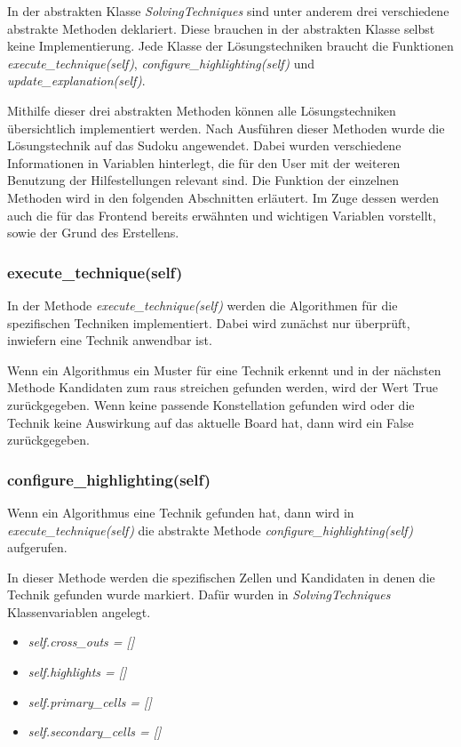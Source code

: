 In der abstrakten Klasse \textit{SolvingTechniques} sind unter anderem drei verschiedene abstrakte Methoden deklariert. Diese brauchen in der abstrakten Klasse selbst keine Implementierung. Jede Klasse der Lösungstechniken braucht die Funktionen \textit{execute\_technique(self)}, \textit{configure\_highlighting(self)} und \textit{update\_explanation(self)}.

Mithilfe dieser drei abstrakten Methoden können alle Lösungstechniken übersichtlich implementiert werden. Nach Ausführen dieser Methoden wurde die Lösungstechnik auf das Sudoku angewendet. Dabei  wurden verschiedene Informationen in Variablen hinterlegt, die für den User mit der weiteren Benutzung der Hilfestellungen relevant sind.
Die Funktion der einzelnen Methoden wird in den folgenden Abschnitten erläutert. Im Zuge dessen werden auch die für das Frontend bereits erwähnten und wichtigen Variablen vorstellt, sowie der Grund des Erstellens.

\subsubsection{execute\_technique(self)}
In der Methode \textit{execute\_technique(self)} werden die Algorithmen für die spezifischen Techniken implementiert. Dabei wird zunächst nur überprüft, inwiefern eine Technik anwendbar ist. 

Wenn ein Algorithmus ein Muster für eine Technik erkennt und in der nächsten Methode Kandidaten zum raus streichen gefunden werden, wird der Wert True zurückgegeben. Wenn keine passende Konstellation gefunden wird oder die Technik keine Auswirkung auf das aktuelle Board hat, dann wird ein False zurückgegeben.

\subsubsection{configure\_highlighting(self)}
Wenn ein Algorithmus eine Technik gefunden hat, dann wird in \textit{execute\_technique(self)} die abstrakte Methode 
\textit{configure\_highlighting(self)} aufgerufen. 

In dieser Methode werden die spezifischen Zellen und Kandidaten in denen die Technik gefunden wurde markiert. Dafür wurden in \textit{SolvingTechniques} Klassenvariablen angelegt. 
\begin{itemize}
	\item \textit{self.cross\_outs = []}
	\item \textit{self.highlights = []}
	\item \textit{self.primary\_cells = []}
	\item \textit{self.secondary\_cells = []}
\end{itemize}


